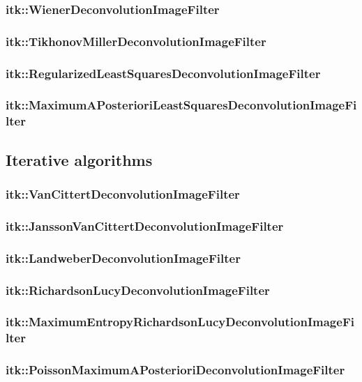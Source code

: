 \documentclass{InsightArticle}
\begin{document}
\subsubsection{itk::WienerDeconvolutionImageFilter}
\subsubsection{itk::TikhonovMillerDeconvolutionImageFilter}
\subsubsection{itk::RegularizedLeastSquaresDeconvolutionImageFilter}
\subsubsection{itk::MaximumAPosterioriLeastSquaresDeconvolutionImageFilter}

\subsection{Iterative algorithms}
\subsubsection{itk::VanCittertDeconvolutionImageFilter}
\subsubsection{itk::JanssonVanCittertDeconvolutionImageFilter}
\subsubsection{itk::LandweberDeconvolutionImageFilter}
\subsubsection{itk::RichardsonLucyDeconvolutionImageFilter}
\subsubsection{itk::MaximumEntropyRichardsonLucyDeconvolutionImageFilter}
\subsubsection{itk::PoissonMaximumAPosterioriDeconvolutionImageFilter}
\end{document}
